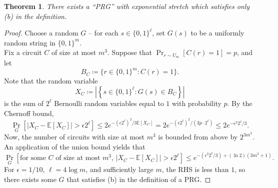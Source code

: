 \documentclass{article}
\newcounter{lecnum}
\newtheorem{theorem}{Theorem}[lecnum]
\newcommand{\E}{\mathbb{E}}
\begin{document}
	\begin{theorem}
		There exists a ``PRG'' with exponential stretch which satisfies only (b) in the definition.
	\end{theorem}
	\begin{proof}
		Choose a random $G$ -- for each $s \in \{0,1\}^\ell$, set $G(s)$ to be a uniformly random string in $\{0,1\}^{m}$.\\
		Fix a circuit $C$ of size at most $m^3$. Suppose that $\Pr_{r \sim U_m}[C(r) = 1] = p$, and let
		\[ B_C \coloneqq \{ r \in \{0,1\}^m : C(r) = 1 \}. \]
		Note that the random variable
		\[ X_C \coloneqq \left| \left\{ s \in \{0,1\}^\ell : G(s) \in B_C \right\} \right| \]
		is the sum of $2^{\ell}$ Bernoulli random variables equal to $1$ with probability $p$. By the Chernoff bound,
		\[ \Pr_G\left[ |X_C - \E[X_C]| > \epsilon 2^\ell \right] \le 2e^{-(\epsilon 2^\ell)^2/3\E[X_C]} = 2e^{-(\epsilon 2^\ell)^2 /(3p \cdot 2^{\ell})} \le 2e^{-\epsilon^2 2^{\ell} / 3}. \]
		Now, the number of circuits with size at most $m^3$ is bounded from above by $2^{3m^3}$. An application of the union bound yields that
		\[ \Pr_G[ \text{for some $C$ of size at most $m^3$, } |X_C - \E[X_C]| > \epsilon 2^\ell ] \le e^{-(\epsilon^2 2^\ell/3) + (\ln 2)(3m^3 + 1)}. \]
		For $\epsilon = 1/10$, $\ell = 4\log m$, and sufficiently large $m$, the RHS is less than $1$, so there exists some $G$ that satisfies (b) in the definition of a PRG.
	\end{proof}
\end{document}
